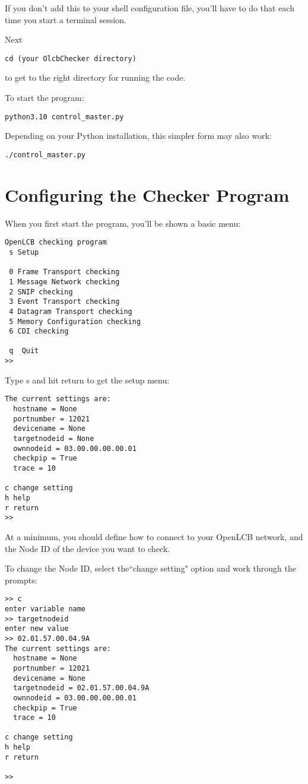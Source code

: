 \documentclass[11pt]{article}
\begin{document}
If you don't add this to your shell configuration file, you'll have to do 
that each time you start a terminal session.

Next
\begin{verbatim}
cd (your OlcbChecker directory)
\end{verbatim}
to get to the right directory for running the code. 

To start the program:
\begin{verbatim}
python3.10 control_master.py
\end{verbatim}

Depending on your Python installation, this simpler form may also work:
\begin{verbatim}
./control_master.py
\end{verbatim}


\section{Configuring the Checker Program}

When you first start the program, you'll be shown a basic menu:

\begin{verbatim}
OpenLCB checking program
 s Setup

 0 Frame Transport checking
 1 Message Network checking
 2 SNIP checking
 3 Event Transport checking
 4 Datagram Transport checking
 5 Memory Configuration checking
 6 CDI checking
  
 q  Quit
>> 
\end{verbatim}

Type s and hit return to get the setup menu:

\begin{verbatim}
The current settings are:
  hostname = None
  portnumber = 12021
  devicename = None
  targetnodeid = None
  ownnodeid = 03.00.00.00.00.01
  checkpip = True
  trace = 10

c change setting
h help
r return
>> 
\end{verbatim}

At a minimum, you should define how to connect to your OpenLCB network,
and the Node ID of the device you want to check.  

To change the Node ID, select the``change setting" option and work through the prompts:

\begin{verbatim}
>> c
enter variable name
>> targetnodeid
enter new value
>> 02.01.57.00.04.9A
The current settings are:
  hostname = None
  portnumber = 12021
  devicename = None
  targetnodeid = 02.01.57.00.04.9A
  ownnodeid = 03.00.00.00.00.01
  checkpip = True
  trace = 10

c change setting
h help
r return

>> 
\end{verbatim}
\end{document}
